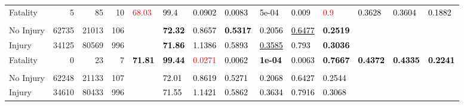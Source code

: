 \documentclass[]{elsarticle} %
\begin{document}
\begin{table}[!h]
{{\begin{tabular}[t]{lrrrllllllllll}
Fatality & 5 & 85 & 10 & \multirow{-3}{*}{\raggedright\arraybackslash \textcolor{red}{68.03}} & \textcolor{black}{99.4} & \textcolor{black}{0.0902} & \textcolor{black}{0.0083} & \textcolor{black}{5e-04} & \textcolor{black}{0.009} & \textcolor{red}{0.9} & \multirow{-3}{*}{\raggedright\arraybackslash \textcolor{black}{0.3628}} & \multirow{-3}{*}{\raggedright\arraybackslash \textcolor{black}{0.3604}} & \multirow{-3}{*}{\raggedright\arraybackslash \textcolor{black}{0.1882}}\\
\cmidrule{1-14}
\addlinespace[0.3em]
\multicolumn{14}{l}{\textbf{Model 2}}\\
\hspace{1em}No Injury & 62735 & 21013 & 106 &  & \textcolor{black}{\textbf{72.32}} & \textcolor{black}{0.8657} & \textcolor{black}{\textbf{0.5317}} & \textcolor{black}{0.2056} & \textcolor{black}{\underline{0.6477}} & \textcolor{black}{\textbf{0.2519}} &  &  & \\

\hspace{1em}Injury & 34125 & 80569 & 996 &  & \textcolor{black}{\textbf{71.86}} & \textcolor{black}{1.1386} & \textcolor{black}{0.5893} & \textcolor{black}{\underline{0.3585}} & \textcolor{black}{0.793} & \textcolor{black}{\textbf{0.3036}} &  &  & \\

Fatality & 0 & 23 & 7 & \multirow{-3}{*}{\raggedright\arraybackslash \textcolor{black}{\textbf{71.81}}} & \textcolor{black}{\textbf{99.44}} & \textcolor{red}{0.0271} & \textcolor{black}{0.0062} & \textcolor{black}{\textbf{1e-04}} & \textcolor{black}{0.0063} & \textcolor{black}{\textbf{0.7667}} & \multirow{-3}{*}{\raggedright\arraybackslash \textcolor{black}{\textbf{0.4372}}} & \multirow{-3}{*}{\raggedright\arraybackslash \textcolor{black}{\textbf{0.4335}}} & \multirow{-3}{*}{\raggedright\arraybackslash \textcolor{black}{\textbf{0.2241}}}\\
\cmidrule{1-14}
\addlinespace[0.3em]
\multicolumn{14}{l}{\textbf{Model 3}}\\
\hspace{1em}No Injury & 62248 & 21133 & 107 &  & \textcolor{black}{72.01} & \textcolor{black}{0.8619} & \textcolor{black}{0.5271} & \textcolor{black}{0.2068} & \textcolor{black}{0.6427} & \textcolor{black}{0.2544} &  &  & \\

\hspace{1em}Injury & 34610 & 80433 & 996 &  & \textcolor{black}{71.55} & \textcolor{black}{1.1421} & \textcolor{black}{0.5862} & \textcolor{black}{0.3634} & \textcolor{black}{0.7916} & \textcolor{black}{0.3068} &  &  & \\


\end{tabular}}}
\end{table}
\end{document}
